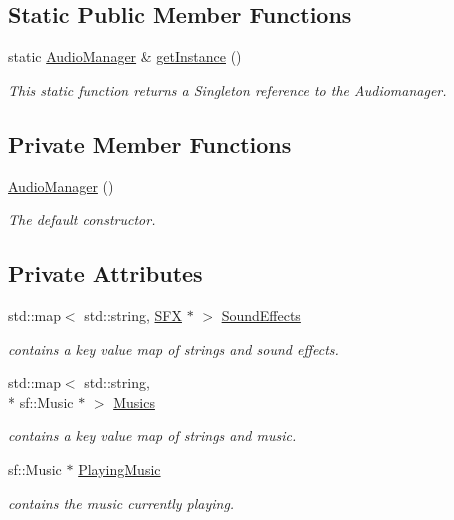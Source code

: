 \subsection*{Static Public Member Functions}
\begin{DoxyCompactItemize}
\item 
static \hyperlink{class_audio_manager}{Audio\-Manager} \& \hyperlink{class_audio_manager_a03807d1257d2e07f666764dda149c47a}{get\-Instance} ()
\begin{DoxyCompactList}\small\item\em This static function returns a Singleton reference to the Audiomanager. \end{DoxyCompactList}\end{DoxyCompactItemize}
\subsection*{Private Member Functions}
\begin{DoxyCompactItemize}
\item 
\hyperlink{class_audio_manager_ae59d8605c1d706e7bab47d4e8f900d09}{Audio\-Manager} ()
\begin{DoxyCompactList}\small\item\em The default constructor. \end{DoxyCompactList}\end{DoxyCompactItemize}
\subsection*{Private Attributes}
\begin{DoxyCompactItemize}
\item 
std\-::map$<$ std\-::string, \hyperlink{class_s_f_x}{S\-F\-X} $\ast$ $>$ \hyperlink{class_audio_manager_a3dcd808b32f86411be40485188f6a917}{Sound\-Effects}
\begin{DoxyCompactList}\small\item\em contains a key value map of strings and sound effects. \end{DoxyCompactList}\item 
std\-::map$<$ std\-::string, \\*
sf\-::\-Music $\ast$ $>$ \hyperlink{class_audio_manager_af4fd3dd64a38f93f808955a626982cc2}{Musics}
\begin{DoxyCompactList}\small\item\em contains a key value map of strings and music. \end{DoxyCompactList}\item 
sf\-::\-Music $\ast$ \hyperlink{class_audio_manager_a8309e75d7e8ac5ecf53d5d8e787d8dc8}{Playing\-Music}
\begin{DoxyCompactList}\small\item\em contains the music currently playing. \end{DoxyCompactList}\end{DoxyCompactItemize}


